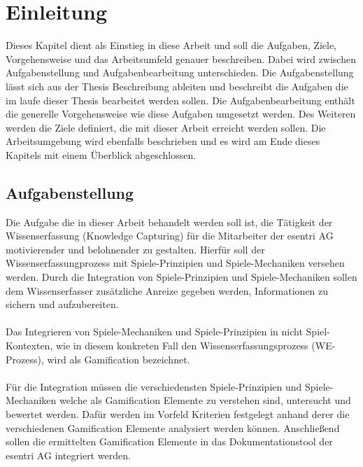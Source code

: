 \documentclass[a4paper,12pt]{scrartcl}
\begin{document}
\section{Einleitung}
Dieses Kapitel dient als Einstieg in diese Arbeit und soll die Aufgaben, Ziele, Vorgehensweise und das Arbeitsumfeld genauer beschreiben. Dabei wird zwischen Aufgabenstellung und Aufgabenbearbeitung unterschieden. Die Aufgabenstellung lässt sich aus der Thesis Beschreibung ableiten und beschreibt die Aufgaben die im laufe dieser Thesis bearbeitet werden sollen. Die Aufgabenbearbeitung enthält die generelle Vorgehensweise wie diese Aufgaben umgesetzt werden. Des Weiteren werden die Ziele definiert, die mit dieser Arbeit erreicht werden sollen. Die Arbeitsumgebung wird ebenfalls beschrieben und es wird am Ende dieses Kapitels mit einem Überblick abgeschlossen.  
\subsection{Aufgabenstellung}
Die Aufgabe die in dieser Arbeit behandelt werden soll ist, die Tätigkeit der Wissenserfassung (Knowledge Capturing) für die Mitarbeiter der esentri AG motivierender und belohnender zu gestalten. Hierfür soll der Wissenserfassungprozess mit Spiele-Prinzipien und Spiele-Mechaniken versehen werden. Durch die Integration von Spiele-Prinzipien und Spiele-Mechaniken sollen dem Wissenserfasser zusätzliche Anreize gegeben werden, Informationen zu sichern und aufzubereiten. 
\\\\
Das Integrieren von Spiele-Mechaniken und Spiele-Prinzipien in nicht Spiel-Kontexten, wie in diesem konkreten Fall den Wissenserfassungsprozess (WE-Prozess), wird als Gamification bezeichnet.
\\\\
Für die Integration müssen die verschiedensten Spiele-Prinzipien und Spiele-Mechaniken welche als Gamification Elemente zu verstehen sind, untersucht und bewertet werden. Dafür werden im Vorfeld Kriterien festgelegt anhand derer die verschiedenen Gamification Elemente analysiert werden können. Anschließend sollen die ermittelten Gamification Elemente in das Dokumentationstool der esentri AG integriert werden.
\end{document}
